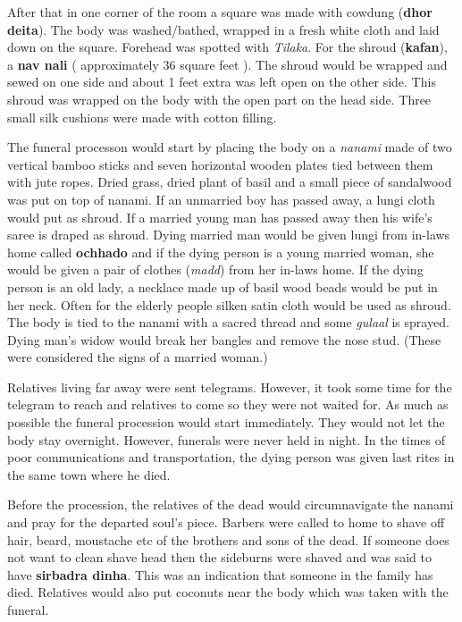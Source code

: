 After that in one corner of the room a square was made with cowdung
(\textbf{dhor deita}). The body was washed/bathed, wrapped in a fresh white
cloth and laid down on the square. Forehead was spotted with \textit{Tilaka}.
For the shroud (\textbf{kafan}), a \textbf{nav nali} ( approximately 36 square
feet ). The shroud would be wrapped and sewed on one side and about 1 feet
extra was left open on the other side. This shroud was wrapped on the body with
the open part on the head side. Three small silk cushions were made with cotton
filling.

The funeral processon would start by placing the body on a \textit{nanami} made
of two vertical bamboo sticks and seven horizontal wooden plates tied between
them with jute ropes. Dried grass, dried plant of basil and a small piece of
sandalwood was put on top of nanami. If an unmarried boy has passed away, a
lungi cloth would put as shroud. If a married young man has passed away then
his wife's saree is draped as shroud. Dying married man would be given lungi
from in-laws home called \textbf{ochhado} and if the dying person is a young
married woman, she would be given a pair of clothes (\textit{madd}) from her
in-laws home. If the dying person is an old lady, a necklace made up of basil
wood beads would be put in her neck. Often for the elderly people silken satin
cloth would be used as shroud. The body is tied to the nanami with a sacred
thread and some \textit{gulaal} is sprayed. Dying man's widow would break her
bangles and remove the nose stud. (These were considered the signs of a married
woman.)

Relatives living far away were sent telegrams. However, it took some time for
the telegram to reach and relatives to come so they were not waited for. As
much as possible the funeral procession would start immediately. They would not
let the body stay overnight. However, funerals were never held in night. In the
times of poor communications and transportation, the dying person was given
last rites in the same town where he died.

Before the procession, the relatives of the dead would circumnavigate the
nanami and pray for the departed soul's piece. Barbers were called to home to
shave off hair, beard, moustache etc of the brothers and sons of the dead. If
someone does not want to clean shave head then the sideburns were shaved and
was said to have \textbf{sirbadra dinha}. This was an indication that someone
in the family has died. Relatives would also put coconuts near the body which
was taken with the funeral.


